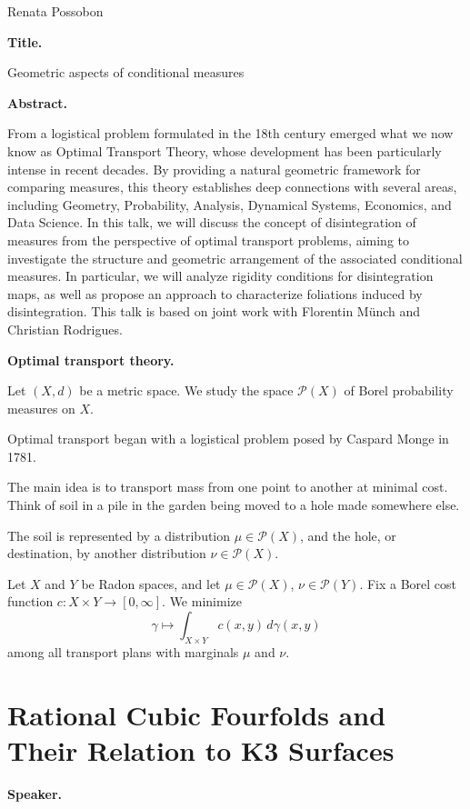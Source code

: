 Renata Possobon

\medskip\noindent
{\bf Title.}

Geometric aspects of
conditional measures

\medskip\noindent
{\bf Abstract.}

From a logistical problem
formulated in the 18th century
emerged what we now know as
Optimal Transport Theory, whose
development has been particularly
intense in recent decades.
By providing a natural geometric
framework for comparing measures,
this theory establishes deep
connections with several areas,
including Geometry, Probability,
Analysis, Dynamical Systems,
Economics, and Data Science.
In this talk, we will discuss the
concept of disintegration of
measures from the perspective of
optimal transport problems, aiming
to investigate the structure and
geometric arrangement of the
associated conditional measures.
In particular, we will analyze
rigidity conditions for
disintegration maps, as well as
propose an approach to characterize
foliations induced by
disintegration.
This talk is based on joint work
with Florentin M\"unch and Christian
Rodrigues.

\medskip\noindent
{\bf Optimal transport theory.}

Let $(X,d)$ be a metric space.
We study the space
$\mathcal{P}(X)$
of Borel probability measures on $X$.

Optimal transport began with a
logistical problem posed by
Caspard Monge in 1781.

The main idea is to transport mass
from one point to another at
minimal cost.
Think of soil in a pile in the garden
being moved to a hole made somewhere
else.

The soil is represented by a
distribution
$\mu\in\mathcal{P}(X)$,
and the hole, or destination,
by another distribution
$\nu\in\mathcal{P}(X)$.

Let $X$ and $Y$ be Radon spaces,
and let
$\mu\in\mathcal{P}(X)$,
$\nu\in\mathcal{P}(Y)$.
Fix a Borel cost function
$c:X\times Y\to[0,\infty]$.
We minimize
\[
\gamma\mapsto
\int_{X\times Y}
c(x,y)\,d\gamma(x,y)
\]
among all transport plans with
marginals $\mu$ and $\nu$.

\section{Rational Cubic Fourfolds and
Their Relation to K3 Surfaces}
\label{label-hodge-birational2}

\medskip\noindent
{\bf Speaker.}

